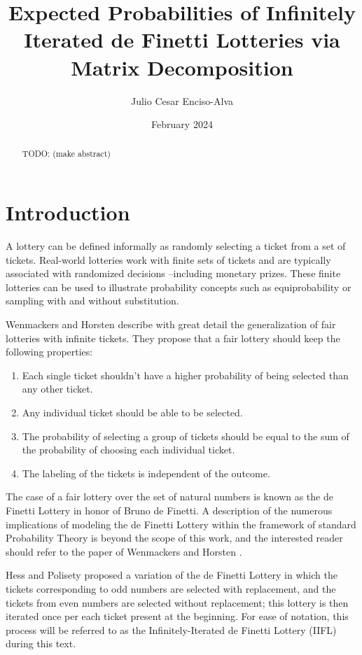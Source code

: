 \documentclass{article}
\title{Expected Probabilities of Infinitely Iterated de Finetti Lotteries via Matrix Decomposition}
\author{Julio Cesar Enciso-Alva}
\date{February 2024}
\begin{document}
\maketitle

\begin{abstract}
    TODO: (make abstract)
\end{abstract}


\section{Introduction}

A lottery can be defined informally as randomly selecting a ticket from a set of tickets. 
%
Real-world lotteries work with finite sets of tickets and are typically associated with randomized decisions --including monetary prizes. 
%
These finite lotteries can be used to illustrate probability concepts such as equiprobability or sampling with and without substitution.

Wenmackers and Horsten \cite{fair_infinite_lottery} describe with great detail the generalization of fair lotteries with infinite tickets.
%
They propose that a fair lottery should keep the following properties:
\begin{enumerate}
    \item Each single ticket shouldn't have a higher probability of being selected than any other ticket.
    \item Any individual ticket should be able to be selected.
    \item The probability of selecting a group of tickets should be equal to the sum of the probability of choosing each individual ticket.
    \item The labeling of the tickets is independent of the outcome.
\end{enumerate}

The case of a fair lottery over the set of natural numbers is known as the de Finetti Lottery in honor of Bruno de Finetti.
%
A description of the numerous implications of modeling the de Finetti Lottery within the framework of standard Probability Theory is beyond the scope of this work, and the interested reader should refer to the paper of Wenmackers and Horsten \cite{fair_infinite_lottery}.


Hess and Polisety \cite{hess2023} proposed a variation of the de Finetti Lottery in which the tickets corresponding to odd numbers are selected with replacement, and the tickets from even numbers are selected without replacement;
this lottery is then iterated once per each ticket present at the beginning.
%
For ease of notation, this process will be referred to as the Infinitely-Iterated de Finetti Lottery (IIFL) during this text.
\end{document}
